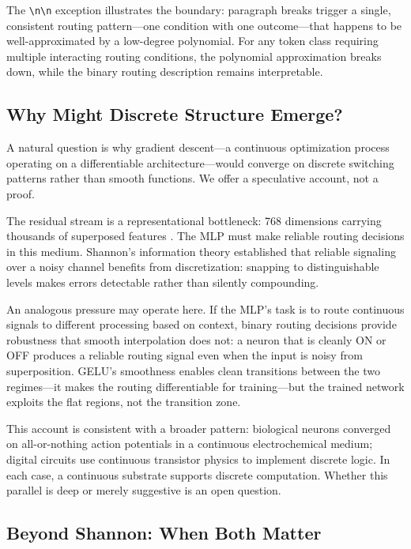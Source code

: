 \documentclass{article}
\begin{document}
The \texttt{\textbackslash n\textbackslash n} exception illustrates the boundary: paragraph
breaks trigger a single, consistent routing pattern---one condition with one outcome---that
happens to be well-approximated by a low-degree polynomial. For any token class requiring
multiple interacting routing conditions, the polynomial approximation breaks down, while the
binary routing description remains interpretable.

\subsection{Why Might Discrete Structure Emerge?}

A natural question is why gradient descent---a continuous optimization process operating on a
differentiable architecture---would converge on discrete switching patterns rather than smooth
functions. We offer a speculative account, not a proof.

The residual stream is a representational bottleneck: 768 dimensions carrying thousands of
superposed features \citep{elhage2022superposition}. The MLP must make reliable routing
decisions in this medium. Shannon's information theory \citep{shannon1948mathematical}
established that reliable signaling over a noisy channel benefits from discretization:
snapping to distinguishable levels makes errors detectable rather than silently compounding.

An analogous pressure may operate here. If the MLP's task is to route continuous signals
to different processing based on context, binary routing decisions provide robustness that
smooth interpolation does not: a neuron that is cleanly ON or OFF produces a reliable
routing signal even when the input is noisy from superposition. GELU's smoothness enables
clean transitions between the two regimes---it makes the routing differentiable for
training---but the trained network exploits the flat regions, not the transition zone.

This account is consistent with a broader pattern: biological neurons converged on
all-or-nothing action potentials in a continuous electrochemical medium; digital circuits
use continuous transistor physics to implement discrete logic. In each case, a continuous
substrate supports discrete computation. Whether this parallel is deep or merely suggestive
is an open question.

\subsection{Beyond Shannon: When Both Matter}
\end{document}
